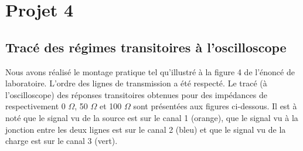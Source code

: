\section{Projet 4}
\subsection{Tracé des régimes transitoires à l'oscilloscope}
\label{s:tracer_transitoire}
Nous avons réalisé le montage pratique tel qu'illustré à la figure 4 de l'énoncé de laboratoire. L'ordre des lignes de transmission a été respecté. Le tracé (à l'oscilloscope) des réponses transitoires obtenues pour des impédances de respectivement 0 $\Omega$, 50 $\Omega$ et 100 $\Omega$ sont présentées aux figures ci-dessous. Il est à noté que le signal vu de la source est sur le canal 1 (orange), que le signal vu à la jonction entre les deux lignes est sur le canal 2 (bleu) et que le signal vu de la charge est sur le canal 3 (vert).

